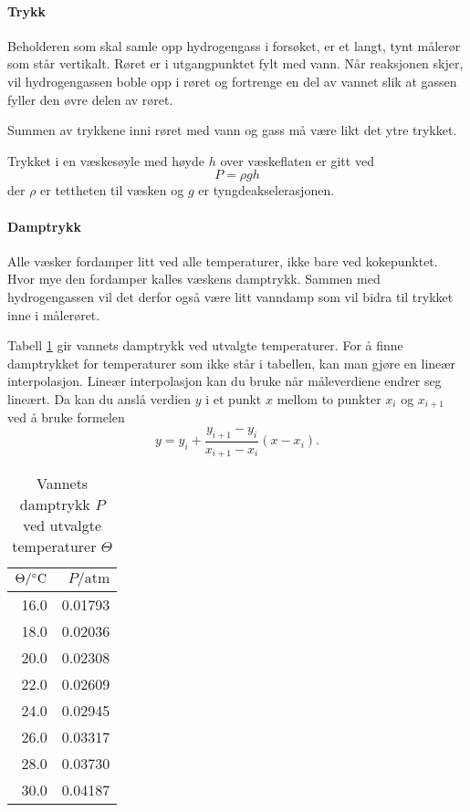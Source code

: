 \documentclass[12pt, a4]{article}
\newcommand{\degree}{\ensuremath{^\circ}}
\begin{document}
	\paragraph{Trykk}
	Beholderen som skal samle opp hydrogengass i forsøket, er et langt, tynt målerør som står vertikalt. Røret er i utgangpunktet fylt med vann. Når reaksjonen skjer, vil hydrogengassen boble opp i røret og fortrenge en del av vannet slik at gassen fyller den øvre delen av røret. 
	
	Summen av trykkene inni røret med vann og gass må være likt det ytre trykket. 
	
	Trykket i en væskesøyle med høyde $h$ over væskeflaten er gitt ved 
	\begin{equation}
	P=\rho gh \label{eq:rgh}
	\end{equation}
	der $\rho$ er tettheten til væsken og $g$ er tyngdeakselerasjonen.
	
	\paragraph{Damptrykk}
	Alle væsker fordamper litt ved alle temperaturer, ikke bare ved kokepunktet. Hvor mye den fordamper kalles væskens damptrykk. Sammen med hydrogengassen vil det derfor også være litt vanndamp som vil bidra til trykket inne i målerøret.
	
	Tabell \ref{vap} gir vannets damptrykk ved utvalgte temperaturer. For å finne damptrykket for temperaturer som ikke står i tabellen, kan man gjøre en lineær interpolasjon. Lineær interpolasjon kan du bruke når måleverdiene endrer seg lineært. Da kan du anslå verdien $y$ i et punkt $x$ mellom to punkter $x_i$ og $x_{i+1}$  ved å bruke formelen
	\begin{equation}
	y = y_i + \frac{y_{i+1} - y_i}{x_{i+1} - x_i}(x-x_i). \label{eq:inter}
	\end{equation}
	
	
	
	\begin{table}[htpb]
		\centering
		\caption{Vannets damptrykk $P$ ved utvalgte temperaturer $\Theta$}
		\label{vap}
		\begin{tabular}{rr}
			\toprule
			$\Theta/\text{\degree C}$ & $P/\text{atm}$ \\
			\midrule
			16.0 & 0.01793 \\
			18.0 & 0.02036 \\
			20.0 & 0.02308 \\
			22.0 & 0.02609 \\
			24.0 & 0.02945 \\
			26.0 & 0.03317 \\
			28.0 & 0.03730 \\
			30.0 & 0.04187 \\ \bottomrule
		\end{tabular}
	\end{table}
	
\end{document}
